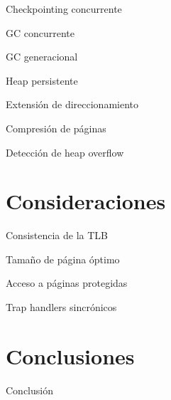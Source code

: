 \documentclass[xcolor=pdftex,dvipsnames,usenames,table]{beamer}
\begin{document}
\begin{frame}{Checkpointing concurrente}
\end{frame}

\begin{frame}{GC concurrente}
\end{frame}

\begin{frame}{GC generacional}
\end{frame}

\begin{frame}{Heap persistente}
\end{frame}

\begin{frame}{Extensión de direccionamiento}
\end{frame}

\begin{frame}{Compresión de páginas}
\end{frame}

\begin{frame}{Detección de heap overflow}
\end{frame}

\section{Consideraciones}

\begin{frame}{Consistencia de la TLB}
\end{frame}

\begin{frame}{Tamaño de página óptimo}
\end{frame}

\begin{frame}{Acceso a páginas protegidas}
\end{frame}

\begin{frame}{Trap handlers sincrónicos}
\end{frame}

\section{Conclusiones}

\begin{frame}{Conclusión}
\end{frame}
\end{document}
